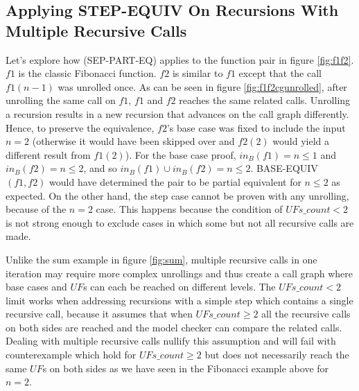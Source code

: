 \subsection{Applying STEP-EQUIV On Recursions With Multiple Recursive Calls}
\label{sec:appstepmrc}


Let's explore how (SEP-PART-EQ) applies to the function pair in figure \ref{fig:f1f2}.
$f1$ is the classic Fibonacci function. $f2$ is similar to $f1$ except that the call  $f1(n-1)$ was unrolled once. As can be seen in figure \ref{fig:f1f2cgunrolled}, after unrolling the same call on $f1$, $f1$ and $f2$ reaches the same related calls. Unrolling a recursion results in a new recursion that advances on the call graph differently. Hence, to preserve the equivalence, $f2$'s base case was fixed to include the input $n=2$ (otherwise it would have been skipped over and $f2(2)$ would yield a different result from $f1(2)$). 
For the base case proof, $in_B(f1) = {n \leq 1}$ and  $in_B(f2) = {n \leq 2}$, and so $in_B(f1) \cup in_B(f2) = {n \leq 2} $. BASE-EQUIV$(f1,f2)$ would have determined the pair to be partial equivalent for ${n \leq 2}$ as expected. On the other hand, the step case cannot be proven with any unrolling, because of the $n=2$ case. This happens because the condition of $UFs\_count < 2$ is not strong enough to exclude cases in which some but not all recursive calls are made.  

Unlike the sum example in figure \ref{fig:sum}, multiple recursive calls in one iteration may require more complex unrollings and thus create a call graph where base cases and $UF$s can each be reached on different levels. The $UFs\_count < 2$ limit works when addressing recursions with a simple step which contains a single recursive call, because it assumes that when $UFs\_count \geq 2$ all the recursive calls on both sides are reached and the model checker can compare the related calls. Dealing with multiple recursive calls nullify this assumption and will fail with counterexample which hold for $UFs\_count \geq 2$ but does not necessarily reach the same $UF$s on both sides as we have seen in the Fibonacci example above for $n = 2$.


